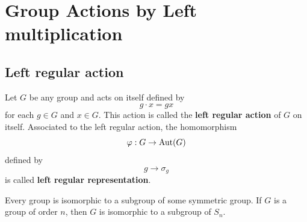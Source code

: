 \section{Group Actions by Left multiplication}

\subsection{Left regular action} %
\begin{definition}
    Let $G$ be any group and acts on itself defined by
    \begin{equation*}
        g\cdot x =gx
    \end{equation*}
    for each $g \in G$ and $x \in G$.
    This action is called the \textbf{left regular action} of $G$ on itself. Associated to the left regular action, the homomorphism
    \[
        \varphi: G \rightarrow {\operatorname{\operatorname{Aut}}}(G)
    \]
    defined by
    \[
        g\rightarrow \sigma_g
    \]
    is called \textbf{left regular representation}.
\end{definition}

\begin{corollary}
    Every group is isomorphic to a subgroup of some symmetric group. If $G$ is a group of order $n$, then $G$ is isomorphic to a subgroup of $S_n$.
\end{corollary}

